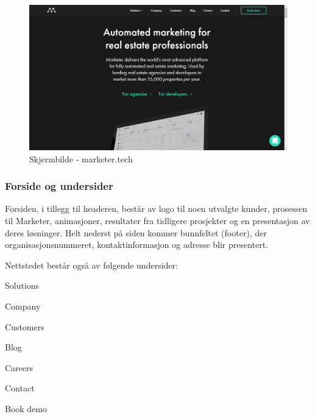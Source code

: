 \begin{figure}[H]
    \centering
    \includegraphics[width=\textwidth]{line/marketer_tech_(1366x768).png}
    \caption{Skjermbilde - marketer.tech}
    \label{fig:competitors-marketer.tech}
\end{figure}

\subsubsection{Forside og undersider}

Forsiden, i tillegg til headeren, består av logo til noen utvalgte kunder, prosessen til Marketer, animasjoner, resultater fra tidligere prosjekter og en presentasjon av deres løsninger. Helt nederst på siden kommer bunnfeltet (footer), der organisasjonsnummeret, kontaktinformasjon og adresse blir presentert.

Nettstedet består også av følgende undersider:
\begin{compactitem}
\item Solutions
\item Company
\item Customers
\item Blog
\item Careers 
\item Contact
\item Book demo
\end{compactitem}

